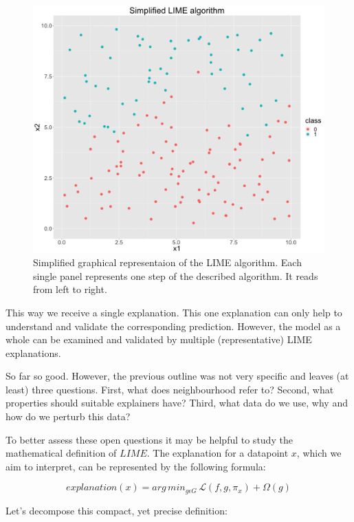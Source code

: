 \documentclass[
]{krantz}
\begin{document}
\begin{figure}

{\centering \includegraphics[width=0.99\linewidth]{images/lime} 

}

\caption{Simplified graphical representaion of the LIME algorithm. Each single panel represents one step of the described algorithm. It reads from left to right.}\label{fig:unnamed-chunk-3}
\end{figure}

This way we receive a single explanation.
This one explanation can only help to understand and validate the corresponding prediction.
However, the model as a whole can be examined and validated by multiple (representative) LIME explanations.

So far so good.
However, the previous outline was not very specific and leaves (at least) three questions.
First, what does neighbourhood refer to?
Second, what properties should suitable explainers have?
Third, what data do we use, why and how do we perturb this data?

To better assess these open questions it may be helpful to study the mathematical definition of \(LIME\).
The explanation for a datapoint \(x\), which we aim to interpret, can be represented by the following formula:

\[explanation\left(x\right) = arg\,min_{g \epsilon G} \,\mathcal{L}\left(f, g, \pi_x \right) + \Omega\left(g\right)\]

Let's decompose this compact, yet precise definition:
\end{document}
